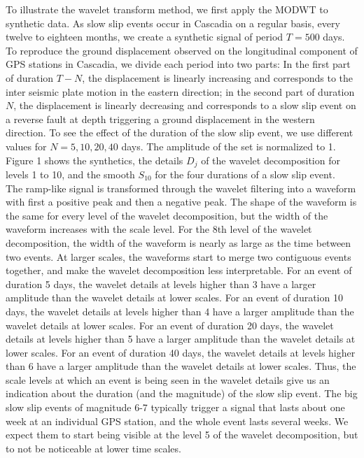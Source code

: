 \documentclass{article}
\begin{document}
To illustrate the wavelet transform method, we first apply the MODWT to synthetic data. As slow slip events occur in Cascadia on a regular basis, every twelve to eighteen months, we create a synthetic signal of period $T = 500$ days. To reproduce the ground displacement observed on the longitudinal component of GPS stations in Cascadia, we divide each period into two parts: In the first part of duration $T - N$, the displacement is linearly increasing and corresponds to the inter seismic plate motion in the eastern direction; in the second part of duration $N$, the displacement is linearly decreasing and corresponds to a slow slip event on a reverse fault at depth triggering a ground displacement in the western direction. To see the effect of the duration of the slow slip event, we use different values for $N = 5, 10, 20, 40$ days. The amplitude of the set is normalized to 1. Figure 1 shows the synthetics, the details $D_j$  of the wavelet decomposition for levels 1 to 10, and the smooth $S_{10}$ for the four durations of a slow slip event. \\

The ramp-like signal is transformed through the wavelet filtering into a waveform with first a positive peak and then a negative peak. The shape of the waveform is the same for every level of the wavelet decomposition, but the width of the waveform increases with the scale level. For the 8th level of the wavelet decomposition, the width of the waveform is nearly as large as the time between two events. At larger scales, the waveforms start to merge two contiguous events together, and make the wavelet decomposition less interpretable. For an event of duration 5 days, the wavelet details at levels higher than 3 have a larger amplitude than the wavelet details at lower scales. For an event of duration 10 days, the wavelet details at levels higher than 4 have a larger amplitude than the wavelet details at lower scales. For an event of duration 20 days, the wavelet details at levels higher than 5 have a larger amplitude than the wavelet details at lower scales. For an event of duration 40 days, the wavelet details at levels higher than 6 have a larger amplitude than the wavelet details at lower scales. Thus, the scale levels at which an event is being seen in the wavelet details give us an indication about the duration (and the magnitude) of the slow slip event. The big slow slip events of magnitude 6-7 typically trigger a signal that lasts about one week at an individual GPS station, and the whole event lasts several weeks. We expect them to start being visible at the level 5 of the wavelet decomposition, but to not be noticeable at lower time scales. \\
\end{document}
